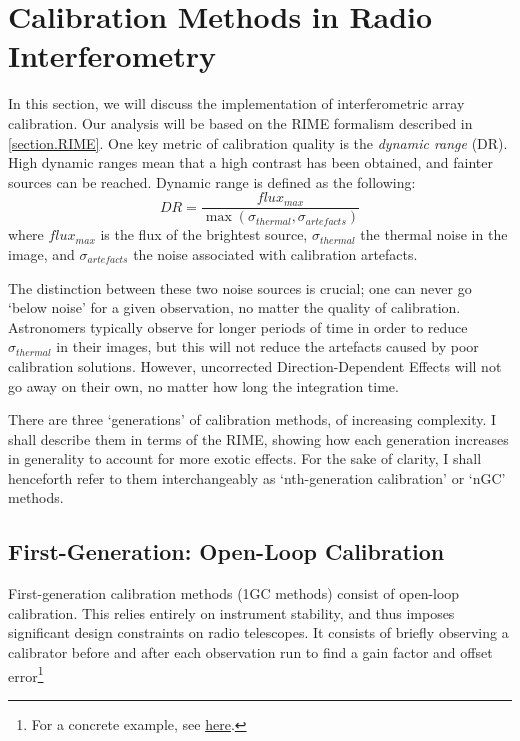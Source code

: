 
\section{Calibration Methods in Radio Interferometry}\label{section.calibration}
\pg
In this section, we will discuss the implementation of interferometric array calibration. Our analysis will be based on the RIME formalism described in \cref{section.RIME}. One key metric of calibration quality is the \emph{dynamic range} (DR). High dynamic ranges mean that a high contrast has been obtained, and fainter sources can be reached. Dynamic range is defined as the following:
\begin{equation}\label{eq.DR}
DR = \frac{flux_{max}}{\max(\sigma_{thermal},\sigma_{artefacts})}
\end{equation}
where $flux_{max}$ is the flux of the brightest source, $\sigma_{thermal}$ the thermal noise in the image, and $\sigma_{artefacts}$ the noise associated with calibration artefacts.

\pg
The distinction between these two noise sources is crucial; one can never go `below noise' for a given observation, no matter the quality of calibration. Astronomers typically observe for longer periods of time in order to reduce $\sigma_{thermal}$ in their images, but this will not reduce the artefacts caused by poor calibration solutions. However, uncorrected Direction-Dependent Effects will not go away on their own, no matter how long the integration time.

\pg
There are three `generations' of calibration methods, of increasing complexity. I shall describe them in terms of the RIME, showing how each generation increases in generality to account for more exotic effects. For the sake of clarity, I shall henceforth refer to them interchangeably as `nth-generation calibration' or `nGC' methods.

\subsection{First-Generation: Open-Loop Calibration}\label{section.calibration.1gc}

\pg
First-generation calibration methods (1GC methods) consist of open-loop calibration. This relies entirely on instrument stability, and thus imposes significant design constraints on radio telescopes. It consists of briefly observing a calibrator before and after each observation run to find a gain factor and offset error\footnote{For a concrete example, see \href{http://www.analog.com/en/analog-dialogue/articles/open-loop-calibration-techniques.html}{here}.}

